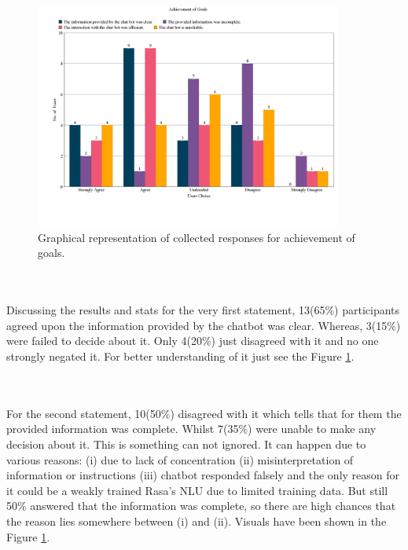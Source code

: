 \begin{figure}[!h]
    \centering
    \includegraphics[width=0.9\textwidth]{img/Achievement_of_Goals_Updated.png}
    \caption{Graphical representation of collected responses for achievement of goals.}
    \label{fig:achievGoals}
\end{figure}
\\~\\
Discussing the results and stats for the very first statement, 13(65\%) participants agreed upon the information provided by the chatbot was clear. Whereas, 3(15\%) were failed to decide about it. Only 4(20\%) just disagreed with it and no one strongly negated it. For better understanding of it just see the Figure \ref{fig:achievGoals}.

\\~\\
For the second statement, 10(50\%) disagreed with it which tells that for them the provided information was complete. Whilst 7(35\%) were unable to make any decision about it. This is something can not ignored. It can happen due to various reasons: (i) due to lack of concentration (ii) misinterpretation of information or instructions (iii) chatbot responded falsely and the only reason for it could be a weakly trained Rasa's NLU due to limited training data. But still 50\% answered that the information was complete, so there are high chances that the reason lies somewhere between (i) and (ii). Visuals have been shown in the Figure \ref{fig:achievGoals}.


